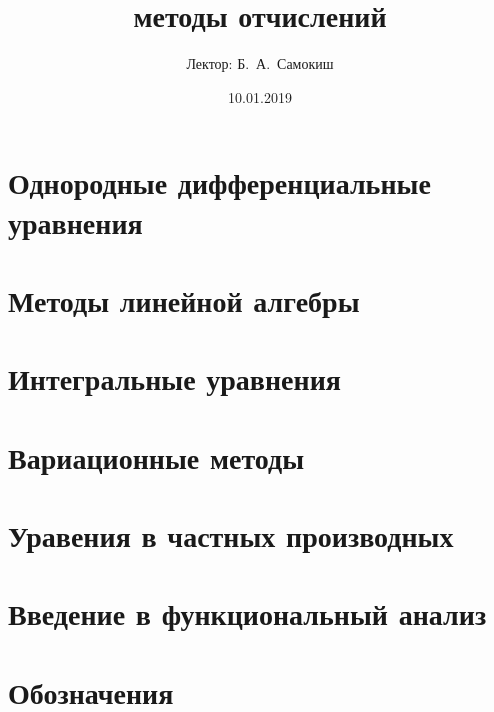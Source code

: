 \documentclass{trlnotes}
\title{методы отчислений}
\date{10.01.2019}
\author{Лектор: Б.~А.~Самокиш}
\begin{document}
 
\maketitle
\tableofcontents
\clearpage

\chapter{Однородные дифференциальные уравнения}
\label{chap:ode}


\chapter{Методы линейной алгебры}

\chapter{Интегральные уравнения}


\chapter{Вариационные методы}

\chapter{Уравения в частных производных}

\clearpage

\appendix
\chapter{Введение в функциональный анализ}


\chapter{Обозначения}
% 

\end{document}
